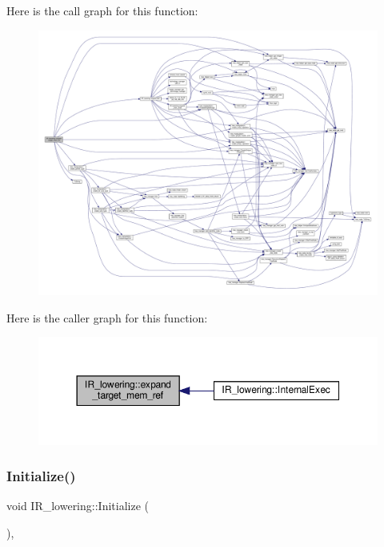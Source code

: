 Here is the call graph for this function\+:
\nopagebreak
\begin{figure}[H]
\begin{center}
\leavevmode
\includegraphics[width=350pt]{df/d7d/classIR__lowering_a374c0d4f54d89c8937343259e202e1b1_cgraph}
\end{center}
\end{figure}
Here is the caller graph for this function\+:
\nopagebreak
\begin{figure}[H]
\begin{center}
\leavevmode
\includegraphics[width=350pt]{df/d7d/classIR__lowering_a374c0d4f54d89c8937343259e202e1b1_icgraph}
\end{center}
\end{figure}
\mbox{\label{classIR__lowering_a88ed11612162d524f892e9329b36380d}} 
\subsubsection{\texorpdfstring{Initialize()}{Initialize()}}
{\footnotesize\ttfamily void I\+R\+\_\+lowering\+::\+Initialize (\begin{DoxyParamCaption}{ }\end{DoxyParamCaption})\hspace{0.3cm}{\ttfamily [override]}, {\ttfamily [virtual]}}



